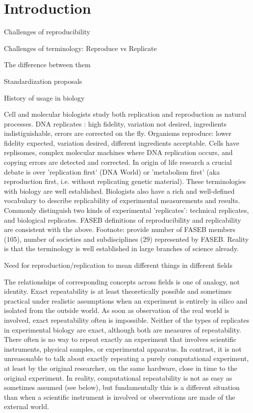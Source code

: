 \section{Introduction}

Challenges of reproducibility

	Challenges of terminology: Reproduce vs Replicate

		The difference between them

		Standardization proposals

		History of usage in biology

			Cell and molecular biologists study both replication and reproduction as natural processes.
			DNA replicates :  high fidelity, variation not desired, ingredients indistiguishable, errors are corrected on the fly.
			Organisms reproduce:  lower fidelity expected, variation desired, different ingredients acceptable.
			Cells have replisomes, complex molecular machines where DNA replication occurs, and copying errors are detected and corrected.
			In origin of life research a crucial debate is over 'replication first' (DNA World) or 
 					'metabolism first' (aka reproduction first, i.e. without replicating genetic material).
			These terminologies with biology are well established.
			Biologists also have a rich and well-defined vocabulary to describe replicability of experimental measurements and results.
			Commonly distinguish two kinds of experimental 'replicates':  technical replicates, and biological replicates.
			FASEB definitions of reproducibility and replicability are consistent with the above.
			Footnote: provide number of FASEB members (105), number of societies and subdisciplines (29) represented by FASEB.
 			Reality is that the terminology is well established in large branches of science already.

		Need for reproduction/replication to mean different things in different fields

			The relationships of corresponding concepts across fields is one of analogy, not identity.
			Exact repeatability is at least theoretically possible and sometimes practical under realistic assumptions when an experiment 
				is entirely in silico and isolated from the outside world.
			As soon as observation of the real world is involved, exact repeatability often is impossible.
			Neither of the types of replicates in experimental biology are exact, although both are measures of repeatability.
			There often is no way to repeat exactly an experiment that involves scientific instruments, physical samples, or experimental apparatus.
			In contrast, it is not unreasonable to talk about exactly repeating a purely computational experiment, at least by the original researcher,
				on the same hardware, close in time to the original experiment.
			In reality, computational repeatability is not as easy as sometimes assumed (see below), but fundamentally this is
				a different situation than when a scientific instrument is involved or observations are made of the external world.


